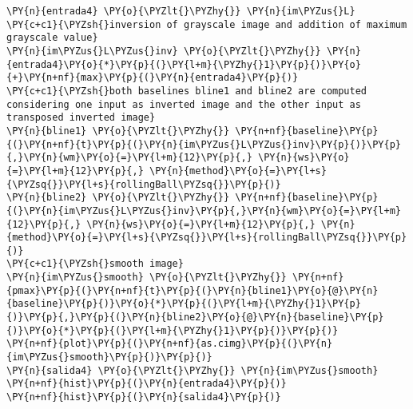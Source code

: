     \begin{tcolorbox}[breakable, size=fbox, boxrule=1pt, pad at break*=1mm,colback=cellbackground, colframe=cellborder]
\begin{Verbatim}[commandchars=\\\{\}]
\PY{n}{entrada4} \PY{o}{\PYZlt{}\PYZhy{}} \PY{n}{im\PYZus{}L}
\PY{c+c1}{\PYZsh{}inversion of grayscale image and addition of maximum grayscale value}
\PY{n}{im\PYZus{}L\PYZus{}inv} \PY{o}{\PYZlt{}\PYZhy{}} \PY{n}{entrada4}\PY{o}{*}\PY{p}{(}\PY{l+m}{\PYZhy{}1}\PY{p}{)}\PY{o}{+}\PY{n+nf}{max}\PY{p}{(}\PY{n}{entrada4}\PY{p}{)}
\PY{c+c1}{\PYZsh{}both baselines bline1 and bline2 are computed considering one input as inverted image and the other input as transposed inverted image}
\PY{n}{bline1} \PY{o}{\PYZlt{}\PYZhy{}} \PY{n+nf}{baseline}\PY{p}{(}\PY{n+nf}{t}\PY{p}{(}\PY{n}{im\PYZus{}L\PYZus{}inv}\PY{p}{)}\PY{p}{,}\PY{n}{wm}\PY{o}{=}\PY{l+m}{12}\PY{p}{,} \PY{n}{ws}\PY{o}{=}\PY{l+m}{12}\PY{p}{,} \PY{n}{method}\PY{o}{=}\PY{l+s}{\PYZsq{}}\PY{l+s}{rollingBall\PYZsq{}}\PY{p}{)}
\PY{n}{bline2} \PY{o}{\PYZlt{}\PYZhy{}} \PY{n+nf}{baseline}\PY{p}{(}\PY{n}{im\PYZus{}L\PYZus{}inv}\PY{p}{,}\PY{n}{wm}\PY{o}{=}\PY{l+m}{12}\PY{p}{,} \PY{n}{ws}\PY{o}{=}\PY{l+m}{12}\PY{p}{,} \PY{n}{method}\PY{o}{=}\PY{l+s}{\PYZsq{}}\PY{l+s}{rollingBall\PYZsq{}}\PY{p}{)}
\PY{c+c1}{\PYZsh{}smooth image}
\PY{n}{im\PYZus{}smooth} \PY{o}{\PYZlt{}\PYZhy{}} \PY{n+nf}{pmax}\PY{p}{(}\PY{n+nf}{t}\PY{p}{(}\PY{n}{bline1}\PY{o}{@}\PY{n}{baseline}\PY{p}{)}\PY{o}{*}\PY{p}{(}\PY{l+m}{\PYZhy{}1}\PY{p}{)}\PY{p}{,}\PY{p}{(}\PY{n}{bline2}\PY{o}{@}\PY{n}{baseline}\PY{p}{)}\PY{o}{*}\PY{p}{(}\PY{l+m}{\PYZhy{}1}\PY{p}{)}\PY{p}{)}
\PY{n+nf}{plot}\PY{p}{(}\PY{n+nf}{as.cimg}\PY{p}{(}\PY{n}{im\PYZus{}smooth}\PY{p}{)}\PY{p}{)}
\PY{n}{salida4} \PY{o}{\PYZlt{}\PYZhy{}} \PY{n}{im\PYZus{}smooth}
\PY{n+nf}{hist}\PY{p}{(}\PY{n}{entrada4}\PY{p}{)}
\PY{n+nf}{hist}\PY{p}{(}\PY{n}{salida4}\PY{p}{)}
\end{Verbatim}
\end{tcolorbox}

    \begin{center}
    \end{center}
    { \hspace*{\fill} \\}
    
    \begin{center}
    \end{center}
    { \hspace*{\fill} \\}
    
